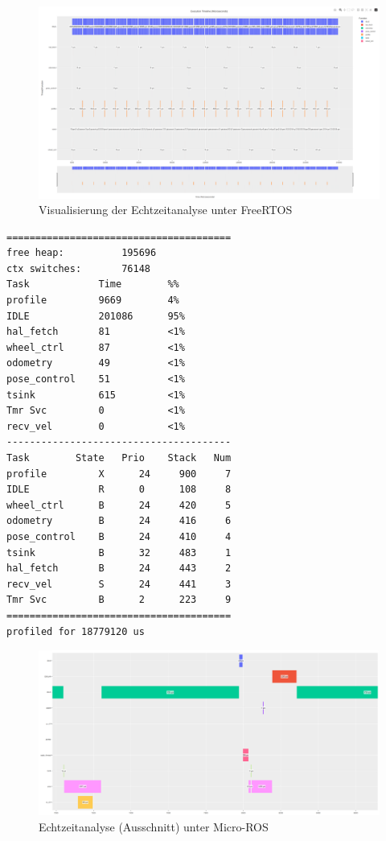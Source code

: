 \begin{figure}[h]
    \centering
    \includegraphics[width=1\textwidth]{assets/freertos_profiling}
    \caption{Visualisierung der Echtzeitanalyse unter FreeRTOS}
\end{figure}

\begin{code}
\begin{verbatim}
=======================================
free heap:          195696
ctx switches:       76148
Task            Time        %%
profile         9669        4%
IDLE            201086      95%
hal_fetch       81          <1%
wheel_ctrl      87          <1%
odometry        49          <1%
pose_control    51          <1%
tsink           615         <1%
Tmr Svc         0           <1%
recv_vel        0           <1%
---------------------------------------
Task        State   Prio    Stack   Num
profile         X      24     900     7
IDLE            R      0      108     8
wheel_ctrl      B      24     420     5
odometry        B      24     416     6
pose_control    B      24     410     4
tsink           B      32     483     1
hal_fetch       B      24     443     2
recv_vel        S      24     441     3
Tmr Svc         B      2      223     9
=======================================
profiled for 18779120 us
\end{verbatim}
\end{code}

\begin{figure}[h]
    \centering
    \includegraphics[width=1\textwidth]{assets/micro_ros_profiling_ausschnitt_cache_enabled}
    \caption{Echtzeitanalyse (Ausschnitt) unter Micro-ROS}
\end{figure}

